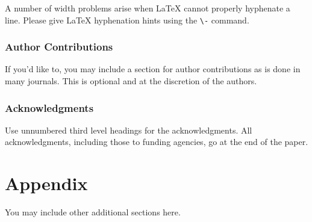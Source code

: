 \documentclass{article} %
\begin{document}
A number of width problems arise when LaTeX cannot properly hyphenate a
line. Please give LaTeX hyphenation hints using the \verb+\-+ command.

\subsubsection*{Author Contributions}
If you'd like to, you may include  a section for author contributions as is done
in many journals. This is optional and at the discretion of the authors.

\subsubsection*{Acknowledgments}
Use unnumbered third level headings for the acknowledgments. All
acknowledgments, including those to funding agencies, go at the end of the paper.





\appendix
\section{Appendix}
You may include other additional sections here.
\end{document}
